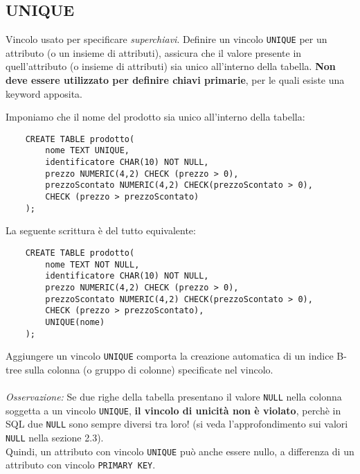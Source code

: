 \documentclass[12pt,a4paper]{book}
\begin{document}
	\subsection{UNIQUE}
	Vincolo usato per specificare \textit{superchiavi}. Definire un vincolo \texttt{UNIQUE} per un attributo (o un insieme di attributi), assicura che il valore presente in quell'attributo (o insieme di attributi) sia unico all'interno della tabella. \textbf{Non deve essere utilizzato per definire chiavi primarie}, per le quali esiste una keyword apposita.\\
	\begin{tcolorbox}[enhanced jigsaw, breakable, title=Esempio, 
		title filled]
	Imponiamo che il nome del prodotto sia unico all'interno della tabella:
	\begin{lstlisting}
	CREATE TABLE prodotto(
		nome TEXT UNIQUE,
		identificatore CHAR(10) NOT NULL,
		prezzo NUMERIC(4,2) CHECK (prezzo > 0),
		prezzoScontato NUMERIC(4,2) CHECK(prezzoScontato > 0),
		CHECK (prezzo > prezzoScontato)
	);
	\end{lstlisting}
	\end{tcolorbox}
	La seguente scrittura è del tutto equivalente:
	\begin{lstlisting}
	CREATE TABLE prodotto(
		nome TEXT NOT NULL,
		identificatore CHAR(10) NOT NULL,
		prezzo NUMERIC(4,2) CHECK (prezzo > 0),
		prezzoScontato NUMERIC(4,2) CHECK(prezzoScontato > 0),
		CHECK (prezzo > prezzoScontato),
		UNIQUE(nome)
	);
	\end{lstlisting}
	Aggiungere un vincolo \texttt{UNIQUE} comporta la creazione automatica di un indice B-tree sulla colonna (o gruppo di colonne) specificate nel vincolo.
	\paragraph{}\textit{Osservazione:} Se due righe della tabella presentano il valore \texttt{NULL} nella colonna soggetta a un vincolo \texttt{UNIQUE}, \textbf{il vincolo di unicità non è violato}, perchè in SQL due \texttt{NULL} sono sempre diversi tra loro! (si veda l'approfondimento sui valori \texttt{NULL} nella sezione 2.3).\\Quindi, un attributo con vincolo \texttt{UNIQUE} può anche essere nullo, a differenza di un attributo con vincolo \texttt{PRIMARY KEY}.
\end{document}
